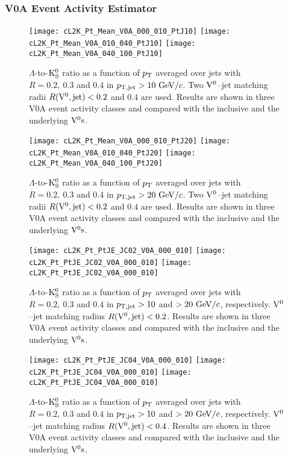 \documentclass[12pt]{article}
\begin{document}
\subsubsection{V0A Event Activity Estimator}

\begin{figure}[htbp]
\centering
\texttt{[image: cL2K\_Pt\_Mean\_V0A\_000\_010\_PtJ10]}
\texttt{[image: cL2K\_Pt\_Mean\_V0A\_010\_040\_PtJ10]}
\texttt{[image: cL2K\_Pt\_Mean\_V0A\_040\_100\_PtJ10]}
\caption{$\Lambda$-to-${\rm K}_{\rm S}^{0}$ ratio as a function of $p_{\rm T}$
  averaged over jets with
  $R=0.2,~0.3$ and $0.4$ in $p_{\rm T,jet}>10~{\rm GeV}/c$.
  Two ${\rm V}^{0}$--jet matching radii $R({\rm V}^{0},{\rm jet})<0.2$ and $0.4$ are used.
  Results are shown in three V0A event activity classes and
  compared with the inclusive and the underlying ${\rm V}^{0}{\rm s}$.}
\label{fig:s01L2KJC0XV0APtj10}
\end{figure}

\begin{figure}[htbp]
\centering
\texttt{[image: cL2K\_Pt\_Mean\_V0A\_000\_010\_PtJ20]}
\texttt{[image: cL2K\_Pt\_Mean\_V0A\_010\_040\_PtJ20]}
\texttt{[image: cL2K\_Pt\_Mean\_V0A\_040\_100\_PtJ20]}
\caption{$\Lambda$-to-${\rm K}_{\rm S}^{0}$ ratio as a function of $p_{\rm T}$
  averaged over jets with
  $R=0.2,~0.3$ and $0.4$ in $p_{\rm T,jet}>20~{\rm GeV}/c$.
  Two ${\rm V}^{0}$--jet matching radii $R({\rm V}^{0},{\rm jet})<0.2$ and $0.4$ are used.
  Results are shown in three V0A event activity classes and
  compared with the inclusive and the underlying ${\rm V}^{0}{\rm s}$.}
\label{fig:s01L2KJC0XV0APtj20}
\end{figure}


\begin{figure}[htbp]
\centering
\texttt{[image: cL2K\_Pt\_PtJE\_JC02\_V0A\_000\_010]}
\texttt{[image: cL2K\_Pt\_PtJE\_JC02\_V0A\_000\_010]}
\texttt{[image: cL2K\_Pt\_PtJE\_JC02\_V0A\_000\_010]}
\caption{$\Lambda$-to-${\rm K}_{\rm S}^{0}$ ratio as a function of $p_{\rm T}$
  averaged over jets with
  $R=0.2,~0.3$ and $0.4$ in $p_{\rm T,jet}>10$ and $>20~{\rm GeV}/c$,
  respectively.
  ${\rm V}^{0}$--jet matching radius $R({\rm V}^{0},{\rm jet})<0.2$.
  Results are shown in three V0A event activity classes and
  compared with the inclusive and the underlying ${\rm V}^{0}{\rm s}$.}
\label{fig:s01L2KJC02V0APtjXX}
\end{figure}

\begin{figure}[htbp]
\centering
\texttt{[image: cL2K\_Pt\_PtJE\_JC04\_V0A\_000\_010]}
\texttt{[image: cL2K\_Pt\_PtJE\_JC04\_V0A\_000\_010]}
\texttt{[image: cL2K\_Pt\_PtJE\_JC04\_V0A\_000\_010]}
\caption{$\Lambda$-to-${\rm K}_{\rm S}^{0}$ ratio as a function of $p_{\rm T}$
  averaged over jets with
  $R=0.2,~0.3$ and $0.4$ in $p_{\rm T,jet}>10$ and $>20~{\rm GeV}/c$,
  respectively.
  ${\rm V}^{0}$--jet matching radius $R({\rm V}^{0},{\rm jet})<0.4$.
  Results are shown in three V0A event activity classes and
  compared with the inclusive and the underlying ${\rm V}^{0}{\rm s}$.}
\label{fig:s01L2KJC04V0APtjXX}
\end{figure}
\end{document}
